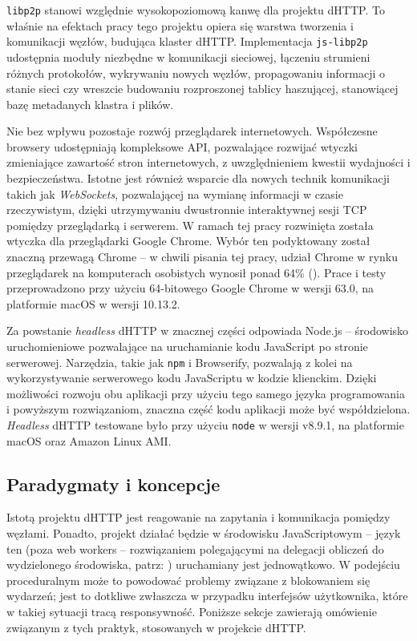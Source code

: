 \texttt{libp2p} stanowi względnie wysokopoziomową kanwę dla projektu dHTTP. To właśnie na efektach pracy tego projektu opiera się warstwa tworzenia i komunikacji węzłów, budująca klaster dHTTP. Implementacja \texttt{js-libp2p} udostępnia moduły niezbędne w komunikacji sieciowej, łączeniu strumieni różnych protokołów, wykrywaniu nowych węzłów, propagowaniu informacji o stanie sieci czy wreszcie budowaniu rozproszonej tablicy haszującej, stanowiącej bazę metadanych klastra i plików.

Nie bez wpływu pozostaje rozwój przeglądarek internetowych. Współczesne browsery udostępniają kompleksowe API, pozwalające rozwijać wtyczki zmieniające zawartość stron internetowych, z uwzględnieniem kwestii wydajności i bezpieczeństwa. Istotne jest również wsparcie dla nowych technik komunikacji takich jak {\em WebSockets}, pozwalającej na wymianę informacji w czasie rzeczywistym, dzięki utrzymywaniu dwustronnie interaktywnej sesji TCP pomiędzy przeglądarką i serwerem. W ramach tej pracy rozwinięta została wtyczka dla przeglądarki Google Chrome. Wybór ten podyktowany został znaczną przewagą Chrome -- w chwili pisania tej pracy, udział Chrome w rynku przeglądarek na komputerach osobistych wynosił ponad 64\% (\cite{chromeStats}). Prace i testy przeprowadzono przy użyciu 64-bitowego Google Chrome w wersji 63.0, na platformie macOS w wersji 10.13.2.

Za powstanie {\em headless} dHTTP w znacznej części odpowiada Node.js -- środowisko uruchomieniowe pozwalające na uruchamianie kodu JavaScript po stronie serwerowej.  Narzędzia, takie jak \texttt{npm} i Browserify, pozwalają z kolei na wykorzystywanie serwerowego kodu JavaScriptu w kodzie klienckim. Dzięki możliwości rozwoju obu aplikacji przy użyciu tego samego języka programowania i powyższym rozwiązaniom, znaczna część  kodu aplikacji może być współdzielona. {\em Headless} dHTTP testowane było przy użyciu \texttt{node} w wersji v8.9.1, na platformie macOS oraz Amazon Linux AMI.


\subsection{Paradygmaty i koncepcje}
Istotą projektu dHTTP jest reagowanie na zapytania i komunikacja pomiędzy węzłami. Ponadto, projekt działać będzie w środowisku JavaScriptowym -- język ten (poza web workers -- rozwiązaniem polegającymi na delegacji obliczeń do wydzielonego środowiska, patrz: \cite{webWorkers}) uruchamiany jest jednowątkowo. W podejściu proceduralnym może to powodować problemy związane z blokowaniem się wydarzeń; jest to dotkliwe zwłaszcza w przypadku interfejsów użytkownika, które w takiej sytuacji tracą responsywność. Poniższe sekcje zawierają omówienie związanym z tych praktyk, stosowanych w projekcie dHTTP.

